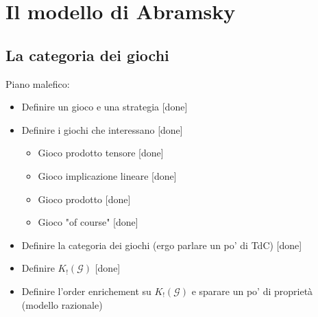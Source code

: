 \documentclass{beamer}
\begin{document}
\section{Il modello di Abramsky}

\subsection{La categoria dei giochi}

\begin{frame}
	Piano malefico:
	\begin{itemize}
	\item Definire un gioco e una strategia [done]
	\item Definire i giochi che interessano [done]
		\begin{itemize}
		\item Gioco prodotto tensore [done]
		\item Gioco implicazione lineare [done]
		\item Gioco prodotto [done]
		\item Gioco "of course" [done]
		\end{itemize}
	\item Definire la categoria dei giochi (ergo parlare un po' di TdC) [done]
	\item Definire $K_! (\mathcal{G})$ [done]
	\item Definire l'order enrichement su $K_! (\mathcal{G})$ e sparare un po' di proprietà (modello razionale)
	\end{itemize}
\end{frame}
\end{document}
